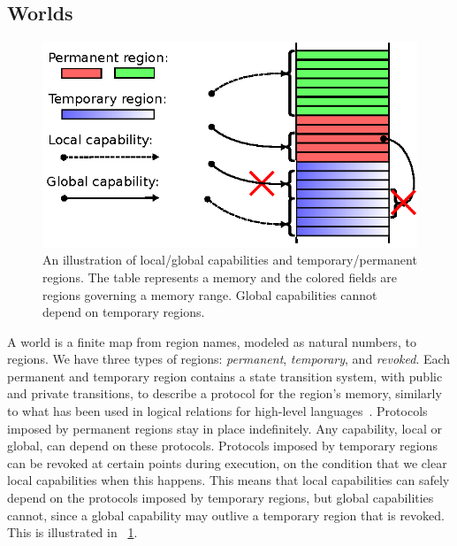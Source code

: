 \documentclass[compsoc,conference,letterpaper,fleqn]{IEEEtran}
\newcommand\lau[1]{{\color{purple} \sf \footnotesize {LS: #1}}\\}
\newcommand\dominique[1]{{\color{purple} \sf \footnotesize {DD: #1}}\\}
\renewcommand\lau[1]{}
\renewcommand\dominique[1]{}
\newcommand{\plainview}[1]{\mathrm{#1}}
\newcommand{\perma}{\plainview{perm}}
\newcommand{\temp}{\plainview{temp}}
\newcommand{\revoked}{\plainview{revoked}}
\begin{document}
\subsection{Worlds}
\begin{figure}
  \centering
  \includegraphics{w11}
  \caption{An illustration of local/global capabilities and temporary/permanent
    regions. The table represents a memory and the colored fields are regions
    governing a memory range. Global capabilities cannot depend on temporary
    regions.}
  \label{fig:cap-world}
\end{figure}
A world is a finite map from region names, modeled as natural numbers, to regions.
We have three types of regions: \emph{permanent}, \emph{temporary}, and \emph{revoked}.
Each permanent and temporary region contains a state transition system, with
public and private transitions, to describe a protocol for the region's memory,
similarly to what has been used in logical relations for high-level
languages~\cite{Ahmed:popl09,Dreyer:jfp12,Devriese:2016ObjCap}. Protocols
imposed by permanent regions stay in place indefinitely. Any capability, local
or global, can depend on these protocols. Protocols imposed by temporary regions
can be revoked at certain points during execution, on the condition that we
clear local capabilities when this happens. This means that local capabilities
can safely depend on the protocols imposed by temporary regions, but global
capabilities cannot, since a global capability may outlive a temporary region
that is revoked. This is illustrated in \figurename~\ref{fig:cap-world}.
\end{document}
